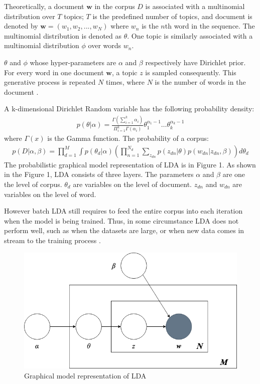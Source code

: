 \documentclass{article} %
\begin{document}
Theoretically, a document $\bm{w}$ in the corpus $D$ is associated with a multinomial distribution over $T$ topics; $T$ is the predefined number of topics, and document is denoted by $\bm{w} = (w_1, w_2, ..., w_N)$ where $w_n$ is the $n$th word in the sequence. The multinomial distribution is denoted as $\theta$. One topic is similarly associated with a multinomial distribution $\phi$ over words $w_n$.

$\theta$ and $\phi$ whose hyper-parameters are $\alpha$ and $\beta$ respectively have Dirichlet prior. For every word in one document $\bm{w}$, a topic $z$ is sampled consequently. This generative process is repeated $N$ times, where $N$ is the number of words in the document \cite{hong_empirical_2010}.

A k-dimensional Dirichlet Random variable has the following probability density:
\begin{align}
p(\theta|\alpha) = \frac{\Gamma(\sum_{i=1}^{k} \alpha_i)}{\Pi_{i=1}^{k}\Gamma(\alpha_i)}\theta_{1}^{\alpha_{1}-1}\dots\theta_{k}^{\alpha_{k}-1}
\end{align}
where $\Gamma(x)$ is the Gamma function.
The probability of a corpus:
\begin{align}
      p(D|\alpha, \beta) = \displaystyle \prod_{d=1}^{M}\int p(\theta_{d}|\alpha) \left( \displaystyle  \prod_{n=1}^{N_d}\sum_{z_{dn}}p(z_{dn}|\theta)p(w_{dn}|z_{dn}, \beta) \right)d\theta_d
\end{align}
The probabilistic graphical model representation of LDA is in Figure 1. As shown in the Figure 1, LDA consists of three layers. The parameters $\alpha$ and $\beta$ are one the level of corpus. $\theta_{d}$ are variables on the level of document. $z_{dn}$ and $w_{dn}$ are variables on the level of word. 

However batch LDA still requires to feed the entire corpus into each iteration when the model is being trained. Thus, in some circumstance LDA does not perform well, such as when the datasets are large, or when new data comes in stream to the training process \cite{hoffman_online_2010}. 
\begin{figure}[H]
      \graphicspath{ {images/} }
      \begin{center}
      \includegraphics[scale=0.4]{LDA.png}
      \end{center}
      \caption{Graphical model representation of LDA}
\end{figure}
\end{document}
